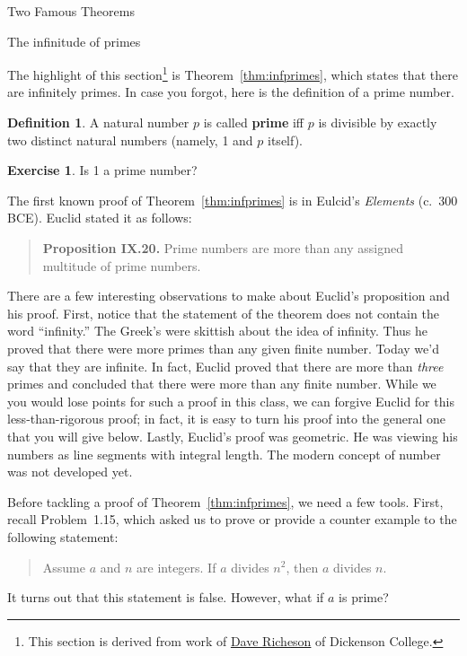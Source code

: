 \documentclass[11pt]{article}
\theoremstyle{definition}
\newtheorem{definition}[theorem]{Definition}
\newtheorem{exercise}[theorem]{Exercise}
\begin{document}
\addtocounter{section}{3}

\begin{section}{Two Famous Theorems}

\begin{subsection}{The infinitude of primes}

The highlight of this section\footnote{This section is derived from work of \href{}{Dave Richeson} of Dickenson College.} is Theorem~\ref{thm:infprimes}, which states that there are infinitely primes. In case you forgot, here is the definition of a prime number.

\begin{definition}
A natural number $p$ is called \textbf{prime} iff $p$ is divisible by exactly two distinct natural numbers (namely, 1 and $p$ itself).
\end{definition}

\begin{exercise}
Is 1 a prime number?
\end{exercise}

The first known proof of Theorem~\ref{thm:infprimes} is in Eulcid's \emph{Elements} (c.\ 300 BCE). Euclid stated it as follows: 
\begin{quote}
\textbf{Proposition IX.20.} Prime numbers are more than any assigned multitude of prime numbers.
\end{quote}
There are a few interesting observations to make about Euclid's proposition and his proof. First, notice that the statement of the theorem does not contain the word ``infinity.'' The Greek's were skittish about the idea of infinity. Thus he proved that there were more primes than any given finite number. Today we'd say that they are infinite. In fact, Euclid proved that there are more than \emph{three} primes and concluded that there were more than any finite number. While we you would lose points for such a proof in this class, we can forgive Euclid for this less-than-rigorous proof;  in fact, it is easy to turn his proof into the general one that you will give below. Lastly, Euclid's proof was geometric. He was viewing his numbers as line segments with integral length. The modern concept of number was not developed yet.

Before tackling a proof of Theorem~\ref{thm:infprimes}, we need a few tools.  First, recall Problem~1.15, which asked us to prove or provide a counter example to the following statement:
\begin{quote}
Assume $a$ and $n$ are integers.  If $a$ divides $n^2$, then $a$ divides $n$.
\end{quote}
It turns out that this statement is false.  However, what if $a$ is prime?


\end{subsection}
\end{section}
\end{document}
